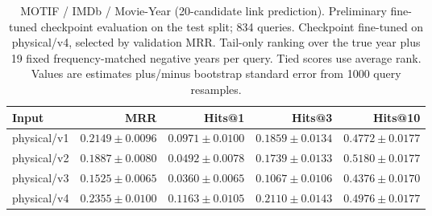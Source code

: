 \begin{table}[t]
\centering
\small
\begin{tabular}{lrrrr}
\toprule
Input & MRR & Hits@1 & Hits@3 & Hits@10 \\
\midrule
physical/v1 & $0.2149 \pm 0.0096$ & $0.0971 \pm 0.0100$ & $0.1859 \pm 0.0134$ & $0.4772 \pm 0.0177$ \\
physical/v2 & $0.1887 \pm 0.0080$ & $0.0492 \pm 0.0078$ & $0.1739 \pm 0.0133$ & $0.5180 \pm 0.0177$ \\
physical/v3 & $0.1525 \pm 0.0065$ & $0.0360 \pm 0.0065$ & $0.1067 \pm 0.0106$ & $0.4376 \pm 0.0170$ \\
physical/v4 & $0.2355 \pm 0.0100$ & $0.1163 \pm 0.0105$ & $0.2110 \pm 0.0143$ & $0.4976 \pm 0.0177$ \\
\bottomrule
\end{tabular}
\caption{MOTIF / IMDb / Movie-Year (20-candidate link prediction). Preliminary fine-tuned checkpoint evaluation on the test split; 834 queries. Checkpoint fine-tuned on physical/v4, selected by validation MRR. Tail-only ranking over the true year plus 19 fixed frequency-matched negative years per query. Tied scores use average rank. Values are estimates plus/minus bootstrap standard error from 1000 query resamples.}
\label{tab:motif-movie_year-link_prediction}
\end{table}
